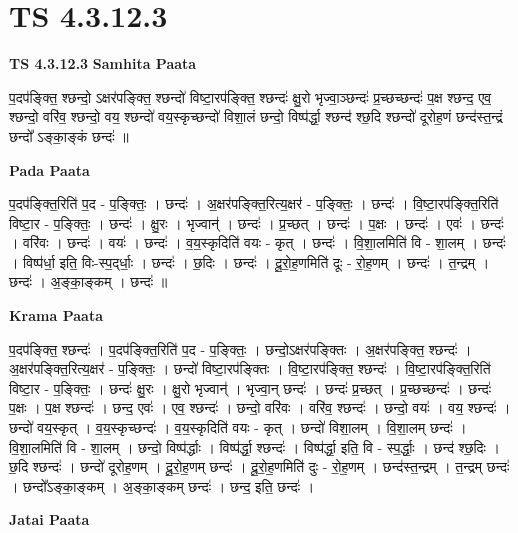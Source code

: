 \documentclass[17pt]{extarticle}
\begin{document}
\section{ TS 4.3.12.3 }

\textbf{TS 4.3.12.3 } \newline
\textbf{Samhita Paata} \newline

प॒दप॑ङ्क्ति॒ श्छन्दो॒ ऽक्षर॑पङ्क्ति॒ श्छन्दो॑ विष्टा॒रप॑ङ्क्ति॒ श्छन्दः॑ क्षु॒रो भृज्वा॒ञ्छन्दः॑ प्र॒च्छच्छन्दः॑ प॒क्ष श्छन्द॒ एव॒ श्छन्दो॒ वरि॑व॒ श्छन्दो॒ वय॒ श्छन्दो॑ वय॒स्कृच्छन्दो॑ विशा॒लं छन्दो॒ विष्प॑र्द्धा॒ श्छन्द॑ श्छ॒दि श्छन्दो॑ दूरोह॒णं छन्द॑स्त॒न्द्रं छन्दो᳚ ऽङ्का॒ङ्कं छन्दः॑ ॥ \newline

\textbf{Pada Paata} \newline

प॒दप॑ङ्क्ति॒रिति॑ प॒द - प॒ङ्क्तिः॒ । छन्दः॑ । अ॒क्षर॑पङ्क्ति॒रित्य॒क्षर॑ - प॒ङ्क्तिः॒ । छन्दः॑ । वि॒ष्टा॒रप॑ङ्क्ति॒रिति॑ विष्टा॒र - प॒ङ्क्तिः॒ । छन्दः॑ । क्षु॒रः । भृज्वान्॑ । छन्दः॑ । प्र॒च्छत् । छन्दः॑ । प॒क्षः । छन्दः॑ । एवः॑ । छन्दः॑ । वरि॑वः । छन्दः॑ । वयः॑ । छन्दः॑ । व॒य॒स्कृदिति॑ वयः - कृत् । छन्दः॑ । वि॒शा॒लमिति॑ वि - शा॒लम् । छन्दः॑ । विष्प॑र्धा॒ इति॒ विः-स्प॒द्‌र्धाः॒ । छन्दः॑ । छ॒दिः । छन्दः॑ । दू॒रो॒ह॒णमिति॑ दूः - रो॒ह॒णम् । छन्दः॑ । त॒न्द्रम् । छन्दः॑ । अ॒ङ्का॒ङ्कम् । छन्दः॑ ॥  \newline


\textbf{Krama Paata} \newline

प॒दप॑ङ्क्ति॒ श्छन्दः॑ । प॒दप॑ङ्क्ति॒रिति॑ प॒द - प॒ङ्क्तिः॒ । छन्दो॒ऽक्षर॑पङ्क्तिः । अ॒क्षर॑पङ्क्ति॒ श्छन्दः॑ । अ॒क्षर॑पङ्क्ति॒रित्य॒क्षर॑ - प॒ङ्क्तिः॒ । छन्दो॑ विष्टा॒रप॑ङ्क्तिः । वि॒ष्टा॒रप॑ङ्क्ति॒ श्छन्दः॑ । वि॒ष्टा॒रप॑ङ्क्ति॒रिति॑ विष्टा॒र - प॒ङ्क्तिः॒ । छन्दः॑ क्षु॒रः । क्षु॒रो भृज्वान्॑ । भृज्वा॒न् छन्दः॑ । छन्दः॑ प्र॒च्छत् । प्र॒च्छच्छन्दः॑ । छन्दः॑ प॒क्षः । प॒क्ष श्छन्दः॑ । छन्द॒ एवः॑ । एव॒ श्छन्दः॑ । छन्दो॒ वरि॑वः । वरि॑व॒ श्छन्दः॑ । छन्दो॒ वयः॑ । वय॒ श्छन्दः॑ । छन्दो॑ वय॒स्कृत् । व॒य॒स्कृच्छन्दः॑ । व॒य॒स्कृदिति॑ वयः - कृत् । छन्दो॑ विशा॒लम् । वि॒शा॒लम् छन्दः॑ । वि॒शा॒लमिति॑ वि - शा॒लम् । छन्दो॒ विष्प॑र्द्धाः । विष्प॑र्द्धा॒ श्छन्दः॑ । विष्प॑र्द्धा॒ इति॒ वि - स्प॒र्द्धाः॒ । छन्द॑ श्छ॒दिः । छ॒दि श्छन्दः॑ । छन्दो॑ दूरोह॒णम् । दू॒रो॒ह॒णम् छन्दः॑ । दू॒रो॒ह॒णमिति॑ दुः - रो॒ह॒णम् । छन्द॑स्त॒न्द्रम् । त॒न्द्रम् छन्दः॑ । छन्दो᳚ऽङ्का॒ङ्कम् । अ॒ङ्का॒ङ्कम् छन्दः॑ । छन्द॒ इति॒ छन्दः॑ । \newline

\textbf{Jatai Paata} \newline
\end{document}
